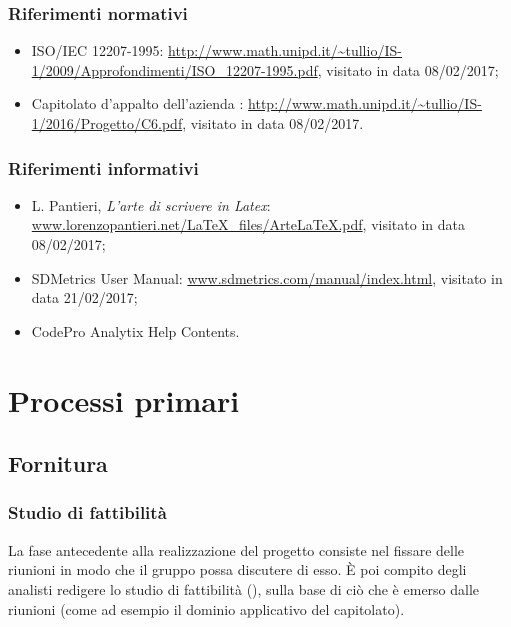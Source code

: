 \subsubsection{Riferimenti normativi}
\begin{itemize}
	\item ISO/IEC 12207-1995: \url{http://www.math.unipd.it/\~tullio/IS-1/2009/Approfondimenti/ISO_12207-1995.pdf}, visitato in data 08/02/2017;
	\item Capitolato d'appalto dell'azienda \ZU: \url{http://www.math.unipd.it/~tullio/IS-1/2016/Progetto/C6.pdf}, visitato in data 08/02/2017. %
\end{itemize}

\subsubsection{Riferimenti informativi}
\begin{itemize}
	\item L. Pantieri, \emph{L'arte di scrivere in Latex}: \url{www.lorenzopantieri.net/LaTeX_files/ArteLaTeX.pdf}, visitato in data 08/02/2017;
	\item SDMetrics User Manual: \url{www.sdmetrics.com/manual/index.html}, visitato in data 21/02/2017;
	\item CodePro Analytix Help Contents.
\end{itemize}





\section{Processi primari} \label{sec:primari}

\subsection{Fornitura}

	\subsubsection{Studio di fattibilità}
	La fase antecedente alla realizzazione del progetto consiste nel fissare delle riunioni in modo che il gruppo possa discutere di esso. È poi compito degli analisti redigere lo studio di fattibilità (\SdF), sulla base di ciò che è emerso dalle riunioni (come ad esempio il dominio applicativo del capitolato).

